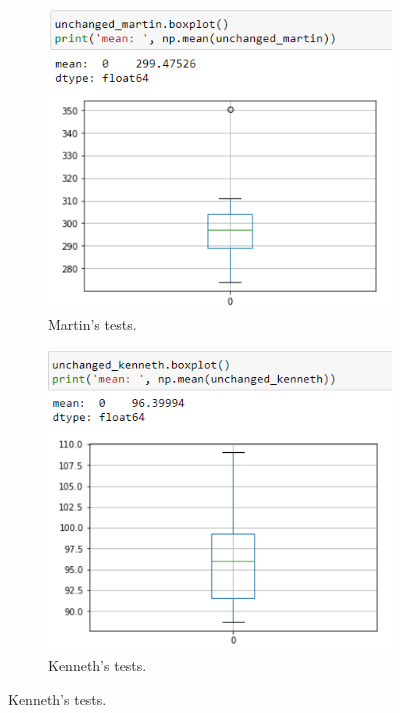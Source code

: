 \documentclass[parskip=full]{scrartcl}
\begin{document}
\begin{figure}
\begin{subfigure}[b]{0.4\textwidth}
    \end{subfigure}
    \begin{subfigure}[b]{0.4\textwidth}
        \caption{Martin's tests.}
        \includegraphics[width=\textwidth]{martin_unchanged.PNG}
    \end{subfigure}
    \begin{subfigure}[b]{0.4\textwidth}
        \caption{Kenneth's tests.} 
        \includegraphics[width=\textwidth]{kenneth_unchanged.PNG}
    \end{subfigure}
  \end{figure}
\end{document}
